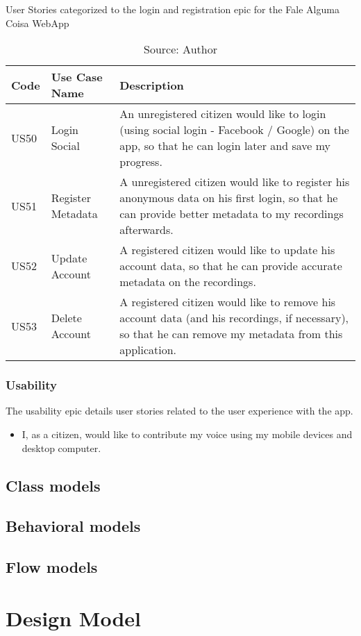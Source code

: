 \begin{table}[h]
\caption{User Stories categorized to the login and registration epic for the Fale Alguma Coisa WebApp}
\label{tab:falealgumacoisa-simplified-login-and-registration}
\centering
\begin{tabular}{|p{1cm}|p{3cm}|p{10cm}|}
\hline
    Code & Use Case Name & Description \\ \hline
    US50 & Login Social & An unregistered citizen would like to login (using social login - Facebook / Google) on the app, so that he can login later and save my progress. \\ \hline
    US51 & Register Metadata & A unregistered citizen would like to register his anonymous data on his first login, so that he can provide better metadata to my recordings afterwards. \\ \hline
    US52 & Update Account & A registered citizen would like to update his account data, so that he can provide accurate metadata on the recordings. \\ \hline
    US53 & Delete Account & A registered citizen would like to remove his account data (and his recordings, if necessary), so that he can remove my metadata from this application. \\ \hline
\end{tabular}
\caption*{Source: Author}
\end{table}










\subsubsection{Usability}

The usability epic details user stories related to the user experience with the app.

\begin{itemize}
    \item I, as a citizen, would like to contribute my voice using my mobile devices and desktop computer.
\end{itemize}

\subsection{Class models}

\subsection{Behavioral models}

\subsection{Flow models}

\section{Design Model}

